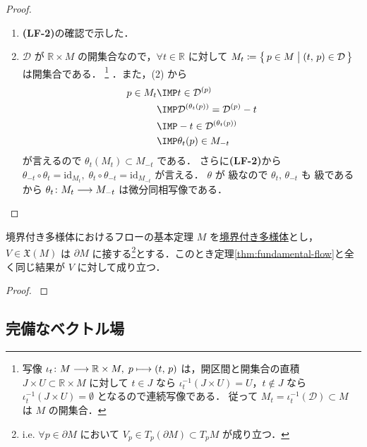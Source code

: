 \documentclass[geometry_main]{subfiles}
\begin{document}
\begin{proof}
\begin{enumerate}
        \item \textbf{\textsf{(LF-2)}}の確認で示した．
        \item $\mathcal{D}$ が $\mathbb{R} \times M$ の開集合なので，$\forall t \in \mathbb{R}$ に対して $M_t \coloneqq \bigl\{\, p \in M \bigm| (t,\, p) \in \mathcal{D} \,\bigr\}$ は開集合である．
        \footnote{
            写像 $\iota_t \colon M \longrightarrow \mathbb{R} \times M,\; p \longmapsto (t,\, p)$ は，開区間と開集合の直積 $J \times U \subset \mathbb{R} \times M$ に対して $t \in J$ なら $\iota_t^{-1}(J \times U) = U$，$t \notin J$ なら $\iota_t^{-1}(J \times U) = \emptyset$ となるので連続写像である． 
            従って $M_t = \iota_t^{-1}(\mathcal{D}) \subset M$ は $M$ の開集合．
        }
        ．また，(2) から
        \begin{align}
            p \in M_t &\IMP t \in \mathcal{D}^{(p)} \\
            &\IMP \mathcal{D}^{(\theta_t(p))} = \mathcal{D}^{(p)} - t \\
            &\IMP -t \in \mathcal{D}^{(\theta_t(p))} \\
            &\IMP \theta_t (p) \in M_{-t}
        \end{align}
        が言えるので $\theta_t (M_t) \subset M_{-t}$ である．
        さらに\textbf{\textsf{(LF-2)}}から $\theta_{-t} \circ \theta_t = \mathrm{id}_{M_t},\; \theta_t \circ \theta_{-t} = \mathrm{id}_{M_{-t}}$ が言える．
        $\theta$ が \cinfty 級なので $\theta_t,\, \theta_{-t}$ も \cinfty 級であるから $\theta_t \colon M_t \longrightarrow M_{-t}$ は微分同相写像である．
    \end{enumerate}
    
\end{proof}

\begin{mytheo}[label=thm:fundamental-flow-boundary]{境界付き多様体におけるフローの基本定理}
    $M$ を\underline{境界付き多様体}とし，$V \in \mathfrak{X}(M)$ は $\partial M$ に接する\footnote{i.e. $\forall p \in \partial M$ において $V_p \in T_p (\partial M) \subset T_p M$ が成り立つ．}とする．このとき定理\ref{thm:fundamental-flow}と全く同じ結果が $V$ に対して成り立つ．
\end{mytheo}

\begin{proof}
    \cite[p.227, Theorem 9.34]{Lee2012smooth}
\end{proof}


\subsection{完備なベクトル場}
\end{document}
